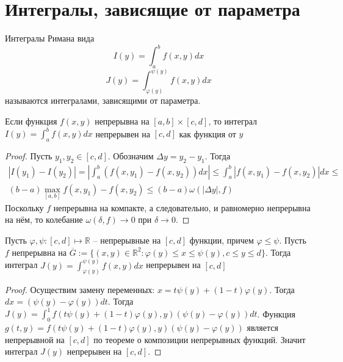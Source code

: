 \documentclass[document.tex]{subfiles}
\begin{document}
\section{Интегралы, зависящие от параметра}

\begin{definition}
    Интегралы Римана вида
    \[
        I(y) = \int_{a}^{b}f(x, y)dx
    \]
    \[
        J(y) = \int_{\varphi(y)}^{\psi(y)}f(x, y)dx
    \]
    называются интегралами, зависящими от параметра.
\end{definition}

\begin{theorem}
    Если функция $f(x, y)$ непрерывна на $[a, b] \times [c, d]$, то интеграл $I(y) = \int_{a}^{b}f(x, y)dx$ непрерывен
    на $[c, d]$ как функция от $y$
\end{theorem}

\begin{proof}
    Пусть $y_1, y_2 \in [c, d]$. Обозначим $\Delta y = y_2 - y_1$. Тогда
    \begin{multline*}
        |I(y_1) - I(y_2)| = \left| \int_{a}^{b}(f(x, y_1) - f(x, y_2))dx \right| \leq \int_{a}^{b}|f(x, y_1) - f(x,
        y_2)|dx \leq \\
        (b - a) \max_{[a, b]} f(x, y_1) - f(x, y_2) \leq (b - a) \omega(|\Delta y|, f)
    \end{multline*}
    Поскольку $f$ непрерывна на компакте, а следовательно, и равномерно непрерывна на нём, то колебание $\omega(\delta,
    f) \rightarrow 0$ при $\delta \rightarrow 0$.
\end{proof}

\begin{theorem}
    Пусть $\varphi, \psi : [c, d] \mapsto \mathbb{R}$ -- непрерывные на $[c, d]$ функции, причем $\varphi \leq \psi$.
    Пусть $f$ непрерывна на $\overline G := \{(x, y) \in \mathbb{R}^2 : \varphi(y) \leq x \leq \psi(y), c \leq y \leq d\}$.
    Тогда интеграл $J(y) = \int_{\varphi(y)}^{\psi(y)}f(x, y)dx$ непрерывен на $[c, d]$
\end{theorem}

\begin{proof}
    Осуществим замену переменных: $x = t \psi(y) + (1 - t) \varphi(y)$. Тогда $dx = (\psi(y) - \varphi(y))dt$. Тогда
    $J(y) = \int_{0}^{1}f(t \psi(y) + (1 - t) \varphi(y), y)(\psi(y) - \varphi(y))dt$. Функция $g(t, y) = f(t \psi(y) +
    (1 - t) \varphi(y), y) (\psi(y) - \varphi(y))$ является непрерывной на $[c, d]$ по теореме о композиции непрерывных
    функций. Значит интеграл $J(y)$ непрерывен на $[c, d]$.
\end{proof}
\end{document}
